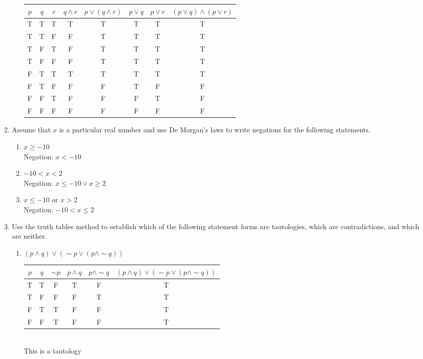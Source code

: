 \documentclass{article}
\begin{document}
\begin{enumerate}
\begin{enumerate}
			\begin{tabular}{|c|c|c|c|c|c|c|c|}
				\hline
				$p$ & $q$ & $r$ & $q \land r$ & $p \lor (q \land r)$ & $p \lor q$ & $p \lor r$ & $(p \lor q) \land (p \lor r)$ \\
				\hline
				T & T & T & T & T & T & T & T \\
				T & T & F & F & T & T & T & T \\
				T & F & T & F & T & T & T & T \\
				T & F & F & F & T & T & T & T \\
				F & T & T & T & T & T & T & T \\
				F & T & F & F & F & T & F & F \\
				F & F & T & F & F & F & T & F \\
				F & F & F & F & F & F & F & F \\
				\hline
			\end{tabular}
		\end{enumerate}
		
		\item Assume that \( x \) is a particular real number and use De Morgan’s laws to write negations for the following statements.
		\begin{enumerate}
			\item \( x \geq -10 \) \\
			Negation: \( x < -10 \)
			
			\item \( -10 < x < 2 \) \\
			Negation: \( x \leq -10 \lor x \geq 2 \) \\ 
			
			\item \( x \leq -10 \) or \( x > 2 \) \\
			Negation: \( -10 < x \leq 2 \)
		\end{enumerate}
		
		\item Use the truth tables method to establish which of the following statement forms are tautologies, which are contradictions, and which are neither.
\begin{enumerate}
	\item \( (p \land q) \lor (\sim p \lor (p \land \sim q)) \) \\

	\begin{tabular}{|c|c|c|c|c|c|}
		\hline
		$p$ & $q$ & $\sim p$ & $p \land q$ & $p \land \sim q$ & $(p \land q) \lor (\sim p \lor (p \land \sim q))$ \\
		\hline
		T & T & F & T & F & T \\
		T & F & F & F & T & T \\
		F & T & T & F & F & T \\
		F & F & T & F & F & T \\
		\hline
	\end{tabular}
	\\
	This is a tautology
	

\end{enumerate}
\end{enumerate}
\end{document}

